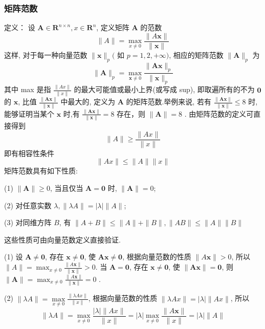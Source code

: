 \subsubsection{矩阵范数}

定义： 设 $ \boldsymbol{A} \in \mathbf{R}^{n \times n}, x \in \mathbf{R}^{n} $, 定义矩阵 $ \boldsymbol{A} $ 的范数
$$
\|A\|=\max _{x \neq 0} \frac{\|A \boldsymbol{x}\|}{\|\boldsymbol{x}\|}
$$
这样, 对于每一种向量范数 $ \|\boldsymbol{x}\|_{p}( $ 如 $ p=1,2,+\infty) $, 相应的矩阵范数 $ \|\boldsymbol{A}\|_{p} $ 为
$$
\|\boldsymbol{A}\|_{p}=\max _{\boldsymbol{x} \neq 0} \frac{\|\boldsymbol{A} \boldsymbol{x}\|_{p}}{\|\boldsymbol{x}\|_{p}}
$$
其中 max 是指 $ \frac{\|A x\|}{\|x\|} $ 的最大可能值或最小上界(或写成 sup), 即取遍所有的不为 $ \mathbf{0} $ 的 $ \boldsymbol{x} $, 比值 $ \frac{\|\boldsymbol{A} \boldsymbol{x}\|}{\|\boldsymbol{x}\|} $ 中最大的, 定义为 $ \boldsymbol{A} $ 的矩阵范数.举例来说, 若有 $ \frac{\|\boldsymbol{A} \boldsymbol{x}\|}{\|\boldsymbol{x}\|} \leqslant 8 $ 时, 能够证明当某个 $ \boldsymbol{x} $ 时,有 $ \frac{\|\boldsymbol{A} \boldsymbol{x}\|}{\|\boldsymbol{x}\|}=8 $ 存在，则 $ \|\boldsymbol{A}\|=8 $ .
由矩阵范数的定义可直接得到
$$
\|A\| \geqslant \frac{\|A x\|}{\|x\|}
$$
即有相容性条件
$$
\|A x\| \leqslant\|A\|\|x\|
$$
矩阵范数具有如下性质:

(1) $ \|\boldsymbol{A}\| \geqslant 0 $, 当且仅当 $ \boldsymbol{A}=\mathbf{0} $ 时, $ \|\boldsymbol{A}\|=0 $;

(2) 对任意实数 $ \lambda,\|\lambda A\|=|\lambda|\|A\| $;

(3) 对同维方阵 $ B $, 有 $ \|A+B\| \leqslant\|A\|+\|B\|,\|A B\| \leqslant\|A\|\|B\| $

这些性质可由向量范数定义直接验证.

(1) 设 $ \boldsymbol{A} \neq \mathbf{0} $, 存在 $ \boldsymbol{x} \neq \mathbf{0} $, 使 $ \boldsymbol{A x} \neq \mathbf{0} $, 根据向量范数的性质 $ \|A \boldsymbol{x}\|>0 $, 所以 $ \|A\|=\max _{x \neq 0} \frac{\|A \boldsymbol{x}\|}{\|\boldsymbol{x}\|}> 0$. 当 $ \boldsymbol{A}=\mathbf{0} $, 存在 $ \boldsymbol{x} \neq \mathbf{0} $, 使 $ \|\boldsymbol{A x}\|=\mathbf{0} $, 则 $ \|\boldsymbol{A}\|=\max _{x \neq 0} \frac{\|A \boldsymbol{x}\|}{\|\boldsymbol{x}\|}=0 $ .

(2) $ \|\lambda A\|=\max\limits _{x \neq 0} \frac{\|\lambda A x\|}{\|x\|} $, 根据向量范数的性质 $ \|\lambda A x\|=|\lambda|\|A x\| $, 所以
$$
\|\lambda A\|=\max _{x \neq 0} \frac{|\lambda|\|A x\|}{\|x\|}=|\lambda| \max _{x \neq 0} \frac{\|A \boldsymbol{x}\|}{\|x\|}=|\lambda|\|A\|
$$

